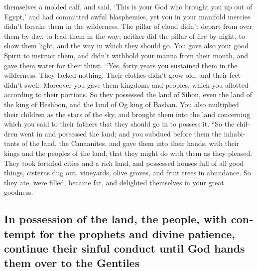 \begin{paracol}{2}
\begin{otherlanguage}{english}
themselves a molded calf, and said, `This is your God who brought you up
out of Egypt,' and had committed awful blasphemies,  yet
you in your manifold mercies didn't forsake them in the wilderness. The
pillar of cloud didn't depart from over them by day, to lead them in the
way; neither did the pillar of fire by night, to show them light, and
the way in which they should go.  You gave also your good
Spirit to instruct them, and didn't withhold your manna from their
mouth, and gave them water for their thirst.  ``Yes,
forty years you sustained them in the wilderness. They lacked nothing.
Their clothes didn't grow old, and their feet didn't swell.
 Moreover you gave them kingdoms and peoples, which you
allotted according to their portions. So they possessed the land of
Sihon, even the land of the king of Heshbon, and the land of Og king of
Bashan.  You also multiplied their children as the stars
of the sky, and brought them into the land concerning which you said to
their fathers that they should go in to possess it.  ``So
the children went in and possessed the land; and you subdued before them
the inhabitants of the land, the Canaanites, and gave them into their
hands, with their kings and the peoples of the land, that they might do
with them as they pleased.  They took fortified cities
and a rich land, and possessed houses full of all good things, cisterns
dug out, vineyards, olive groves, and fruit trees in abundance. So they
ate, were filled, became fat, and delighted themselves in your great
goodness.

\hypertarget{in-possession-of-the-land-the-people-with-contempt-for-the-prophets-and-divine-patience-continue-their-sinful-conduct-until-god-hands-them-over-to-the-gentiles}{%
\subsection{In possession of the land, the people, with contempt for the
prophets and divine patience, continue their sinful conduct until God
hands them over to the
Gentiles}\label{in-possession-of-the-land-the-people-with-contempt-for-the-prophets-and-divine-patience-continue-their-sinful-conduct-until-god-hands-them-over-to-the-gentiles}}


\end{otherlanguage}
\end{paracol}
